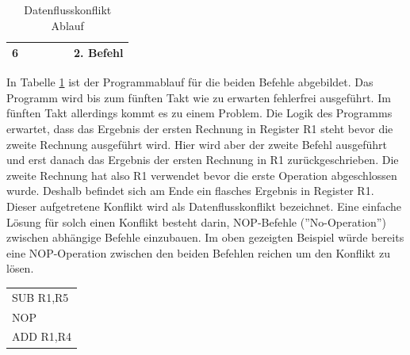 \documentclass[12pt]{article}
\begin{document}
\begin{table}[!htb]
\begin{tabular}{|c|c|c|c|c|c|}
6    &                                                            &                                                              &                                                               &                                           & 2. Befehl                                                       \\ \hline
\end{tabular}
\caption{Datenflusskonflikt Ablauf}
\label{tab:Datenflusskonflikt}
\end{table}

\noindent In Tabelle \ref{tab:Datenflusskonflikt} ist der Programmablauf für die beiden Befehle abgebildet. Das Programm wird bis zum fünften Takt wie zu erwarten fehlerfrei ausgeführt. Im fünften Takt allerdings kommt es zu einem Problem. Die Logik des Programms erwartet, dass das Ergebnis der ersten Rechnung in Register R1 steht bevor die zweite Rechnung ausgeführt wird. Hier wird aber der zweite Befehl ausgeführt und erst danach das Ergebnis der ersten Rechnung in R1 zurückgeschrieben. Die zweite Rechnung hat also R1 verwendet bevor die erste Operation abgeschlossen wurde. Deshalb befindet sich am Ende ein flasches Ergebnis in Register R1. Dieser aufgetretene Konflikt wird als Datenflusskonflikt bezeichnet. Eine einfache Lösung für solch einen Konflikt besteht darin, NOP-Befehle (''No-Operation'') zwischen abhängige Befehle einzubauen. Im oben gezeigten Beispiel würde bereits eine NOP-Operation zwischen den beiden Befehlen reichen um den Konflikt zu lösen.


\begin{table}[!htb]
\centering
\begin{tabular}{l}
SUB R1,R5 \\
NOP       \\
ADD R1,R4
\end{tabular}
\end{table}
\end{document}

